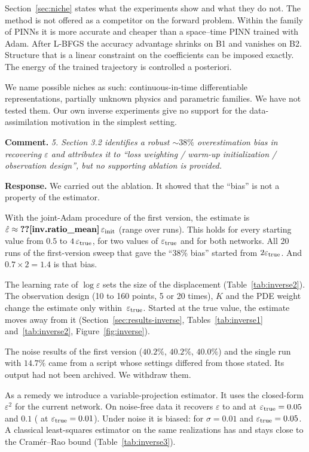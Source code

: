 \documentclass[11pt]{article}
\newcommand{\rc}[1]{\par\medskip\noindent\textbf{Comment.} \emph{#1}\par\smallskip\noindent\textbf{Response.} }
\begin{document}
Section~\ref{sec:niche} states what the experiments show and what they do not. The method is not offered as a competitor on the forward problem. Within the family of PINNs it is more accurate and cheaper than a space--time PINN trained with Adam. After L-BFGS the accuracy advantage shrinks on B1 and vanishes on B2. Structure that is a linear constraint on the coefficients can be imposed exactly. The energy of the trained trajectory is controlled a posteriori.

We name possible niches as such: continuous-in-time differentiable representations, partially unknown physics and parametric families. We have not tested them. Our own inverse experiments give no support for the data-assimilation motivation in the simplest setting.

\rc{5. Section 3.2 identifies a robust $\sim38\%$ overestimation bias in recovering $\varepsilon$ and attributes it to ``loss weighting / warm-up initialization / observation design'', but no supporting ablation is provided.}
We carried out the ablation. It showed that the ``bias'' is not a property of the estimator.

With the joint-Adam procedure of the first version, the estimate is $\hat\varepsilon\approx\N{inv.ratio_mean}\,\varepsilon_{\rm init}$ (range  over  runs). This holds for every starting value from $0.5$ to $4\,\varepsilon_{\rm true}$, for two values of $\varepsilon_{\rm true}$ and for both networks. All 20 runs of the first-version sweep that gave the ``38\% bias'' started from $2\varepsilon_{\rm true}$. And $0.7\times2=1.4$ is that bias.

The learning rate of $\log\varepsilon$ sets the size of the displacement (Table~\ref{tab:inverse2}). The observation design (10 to 160 points, 5 or 20 times), $K$ and the PDE weight change the estimate only within $\,\varepsilon_{\rm true}$. Started at the true value, the estimate moves away from it (Section~\ref{sec:results-inverse}, Tables~\ref{tab:inverse1} and~\ref{tab:inverse2}, Figure~\ref{fig:inverse}).

The noise results of the first version ($40.2\%$, $40.2\%$, $40.0\%$) and the single run with $14.7\%$ came from a script whose settings differed from those stated. Its output had not been archived. We withdraw them.

As a remedy we introduce a variable-projection estimator. It uses the closed-form $\varepsilon^2$ for the current network. On noise-free data it recovers $\varepsilon$ to  and  at $\varepsilon_{\rm true}=0.05$ and $0.1$ ( at $\varepsilon_{\rm true}=0.01$). Under noise it is biased:  for $\sigma=0.01$ and $\varepsilon_{\rm true}=0.05$. A classical least-squares estimator on the same realizations has  and stays close to the Cram\'er--Rao bound (Table~\ref{tab:inverse3}).
\end{document}

